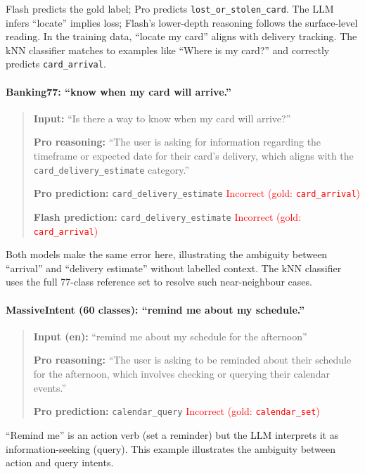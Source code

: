 \noindent Flash predicts the gold label; Pro predicts \texttt{lost\_or\_stolen\_card}.
The LLM infers ``locate'' implies loss; Flash's lower-depth reasoning follows the surface-level reading.
In the training data, ``locate my card'' aligns with delivery tracking.
The kNN classifier matches to examples like ``Where is my card?'' and correctly predicts \texttt{card\_arrival}.

\paragraph{Banking77: ``know when my card will arrive.''}
\begin{quote}
\small
\textbf{Input:} ``Is there a way to know when my card will arrive?''

\textbf{Pro reasoning:} ``The user is asking for information regarding the timeframe or expected date for their card's delivery, which aligns with the \texttt{card\_delivery\_estimate} category.''

\textbf{Pro prediction:} \texttt{card\_delivery\_estimate} \hfill \textcolor{red}{Incorrect (gold: \texttt{card\_arrival})}

\textbf{Flash prediction:} \texttt{card\_delivery\_estimate} \hfill \textcolor{red}{Incorrect (gold: \texttt{card\_arrival})}
\end{quote}

\noindent Both models make the same error here, illustrating the ambiguity between ``arrival'' and ``delivery estimate'' without labelled context.
The kNN classifier uses the full 77-class reference set to resolve such near-neighbour cases.

\paragraph{MassiveIntent (60 classes): ``remind me about my schedule.''}
\begin{quote}
\small
\textbf{Input (en):} ``remind me about my schedule for the afternoon''

\textbf{Pro reasoning:} ``The user is asking to be reminded about their schedule for the afternoon, which involves checking or querying their calendar events.''

\textbf{Pro prediction:} \texttt{calendar\_query} \hfill \textcolor{red}{Incorrect (gold: \texttt{calendar\_set})}
\end{quote}

\noindent ``Remind me'' is an action verb (set a reminder) but the LLM interprets it as information-seeking (query).
This example illustrates the ambiguity between action and query intents.

